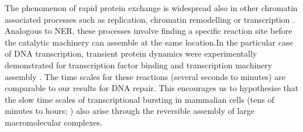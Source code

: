 The phenomenon of rapid protein exchange is widespread also in other chromatin associated processes such as replication, chromatin remodelling or transcription \cite{McNairn2005,Erdel2011,Sonneville2012,Stasevich2011}. Analogous to NER, these processes involve finding a specific reaction site before the catalytic machinery can assemble at the same location.In the particular case of DNA transcription, transient protein dynamics were experimentally demonstrated for transcription factor binding and transcription machinery assembly \cite{Hager2009}. The time scales for these reactions (several seconds to minutes) are comparable to our results for DNA repair. This encourages us to hypothesise that the slow time scales of transcriptional bursting in mammalian cells (tens of minutes to hours; \cite{Harper2011,Suter2011}) also arise through the reversible assembly of large macromolecular complexes.   



